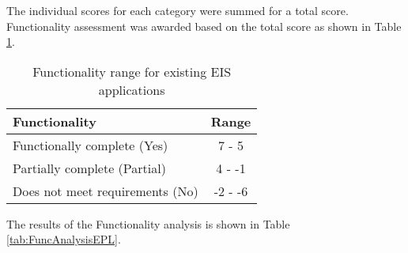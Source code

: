 The individual scores for each category were summed for a total score. Functionality assessment was awarded based on the total score as shown in Table \ref{tab:funcrange}.

\begin{table}[H]
\centering
\caption{Functionality range for existing EIS applications}
\label{tab:funcrange}
\begin{tabular}{@{}lc@{}}
\toprule
\textbf{Functionality} & \textbf{Range} \\ \midrule
Functionally complete (Yes) & 7 - 5 \\
Partially complete (Partial) & 4 - -1 \\
Does not meet requirements (No) & -2 - -6 \\ \bottomrule
\end{tabular}
\end{table}

The results of the Functionality analysis is shown in Table \ref{tab:FuncAnalysisEPL}. 



